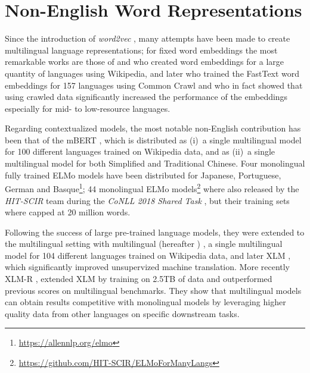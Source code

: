 \section{Non-English Word Representations}

Since the introduction of \emph{word2vec} \citep{mikolov-etal-2013-distributed}, many attempts have been made to create multilingual language representations; for fixed word embeddings the most remarkable works are those of \citep{al-rfou-etal-2013-polyglot} and \citep{bojanowski-etal-2017-enriching} who created word embeddings for a large quantity of languages using Wikipedia, and later \citep{grave-etal-2018-learning} who trained the FastText word embeddings for 157 languages using Common Crawl and who in fact showed that using crawled data significantly increased the performance of the embeddings especially for mid- to low-resource languages.

Regarding contextualized models, the most notable non-English contribution has been that of the mBERT \citep{devlin-etal-2019-bert}, which is distributed as (i)~a single multilingual model for 100 different languages trained on Wikipedia data, and as (ii)~a single multilingual model for both Simplified and Traditional Chinese. Four monolingual fully trained ELMo models have been distributed for Japanese, Portuguese, German and Basque\footnote{\url{https://allennlp.org/elmo}}; 44 monolingual ELMo models\footnote{\url{https://github.com/HIT-SCIR/ELMoForManyLangs}} where also released by the \emph{HIT-SCIR} team \citep{che-etal-2018-towards} during the \emph{CoNLL 2018 Shared Task} \citep{zeman-etal-2018-conll}, but their training sets where capped at 20 million words.

Following the success of large pre-trained language models, they were extended to the multilingual setting with multilingual \bert (hereafter \mbert) \citep{devlin-etal-2019-bert}, a single multilingual model for 104 different languages trained on Wikipedia data, and later XLM \citep{conneau-lample-2019-cross}, which significantly improved unsupervized machine translation. More recently XLM-R \citep{conneau-etal-2020-unsupervised}, extended XLM by training on 2.5TB of data and outperformed previous scores on multilingual benchmarks. They show that multilingual models can obtain results competitive with monolingual models by leveraging higher quality data from other languages on specific downstream tasks.

